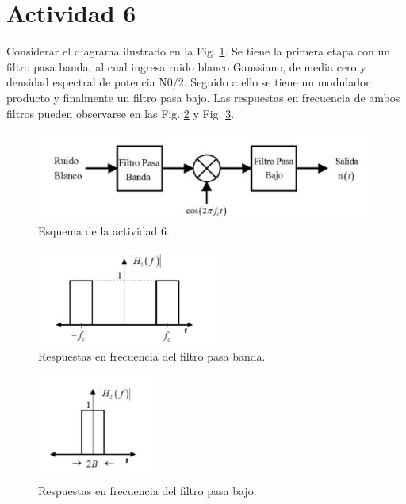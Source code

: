 \section{Actividad 6}
\bigskip

	Considerar el diagrama ilustrado en la Fig. \ref{sistema}. Se tiene la primera etapa con un filtro
	pasa banda, al cual ingresa ruido blanco Gaussiano, de media cero y densidad espectral
	de potencia N0/2. Seguido a ello se tiene un modulador producto y finalmente un filtro
	pasa bajo. Las respuestas en frecuencia de ambos filtros pueden observarse en las Fig. \ref{pasabanda} y Fig. \ref{pasabajo}.


	\begin{figure}[H]
		\centering
		\includegraphics[width=12cm]{act_4_sistema.jpg}
		\caption{Esquema de la actividad 6.}
		\label{sistema}
	\end{figure}

	\begin{figure}[H]
		\centering
		\includegraphics[width=6cm]{act4_pasabanda.jpg}
		\caption{Respuestas en frecuencia del filtro pasa banda.}
		\label{pasabanda}
	\end{figure}

	\begin{figure}[H]
		\centering
		\includegraphics[width=4cm]{act_4_pbajos.jpg}
		\caption{Respuestas en frecuencia del filtro pasa bajo.}
		\label{pasabajo}
	\end{figure}



